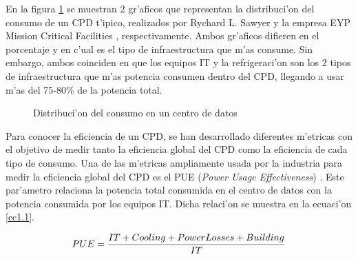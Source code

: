 	En la figura \ref{fig1_1:cons} se muestran 2 gr'aficos que representan la distribuci'on del consumo de un CPD t'ipico, realizados   por Rychard L. Sawyer \cite{consumo1} y la empresa EYP Mission Critical Facilities \cite{consumo2}, respectivamente. Ambos gr'aficos difieren en el porcentaje y en c'ual es el tipo de infraestructura que m'as consume. Sin embargo, ambos coinciden en que los equipos IT y la refrigeraci'on son los 2 tipos de infraestructura que m'as potencia consumen dentro del CPD, llegando a usar m'as del 75-80\% de la potencia total.

\begin{figure}[htbp]
  \raggedright
   \caption{Distribuci'on del consumo en un centro de datos}
   \label{fig1_1:cons}
\end{figure}

	Para conocer la eficiencia de un CPD, se han desarrollado diferentes m'etricas con el objetivo de medir tanto la eficiencia global del CPD como la eficiencia de cada tipo de consumo. Una de las m'etricas ampliamente usada por la industria para medir la eficiencia global del CPD es el PUE (\textit{Power Usage Effectiveness}) \cite{PUE}. Este par'ametro relaciona la potencia total consumida en el centro de datos con la potencia consumida por los equipos IT. Dicha relaci'on se muestra en la ecuaci'on \ref{ec1.1}.  

\begin{equation}\label{ec1.1}
\normalsize
 PUE= \frac{IT + Cooling + PowerLosses + Building}{IT}
\end{equation}

